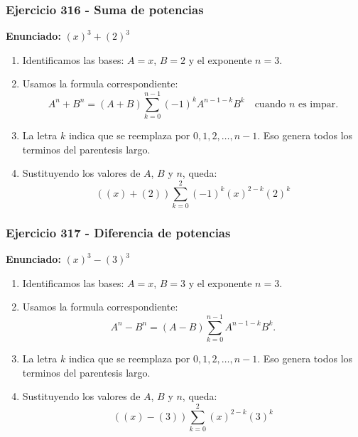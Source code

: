 \documentclass[11pt,a4paper]{article}
\begin{document}
\subsubsection*{Ejercicio 316 - Suma de potencias}
\textbf{Enunciado:} $ \left(x\right)^{3}+\left(2\right)^{3} $\par
\begin{enumerate}[leftmargin=2em]
\item Identificamos las bases: \(A=x\), \(B=2\) y el exponente \(n=3\).
\item Usamos la formula correspondiente: \[A^n+B^n=(A+B)\sum_{k=0}^{n-1}(-1)^kA^{n-1-k}B^k\quad\text{cuando }n\text{ es impar}.\]
\item La letra \(k\) indica que se reemplaza por \(0,1,2,\ldots,n-1\). Eso genera todos los terminos del parentesis largo.
\item Sustituyendo los valores de \(A\), \(B\) y \(n\), queda: \[\boxed{\left(\left(x\right)+\left(2\right)\right)\sum_{k=0}^{2}(-1)^k\left(x\right)^{2-k}\left(2\right)^k}\]
\end{enumerate}

\vspace{0.2cm}
\subsubsection*{Ejercicio 317 - Diferencia de potencias}
\textbf{Enunciado:} $ \left(x\right)^{3}-\left(3\right)^{3} $\par
\begin{enumerate}[leftmargin=2em]
\item Identificamos las bases: \(A=x\), \(B=3\) y el exponente \(n=3\).
\item Usamos la formula correspondiente: \[A^n-B^n=(A-B)\sum_{k=0}^{n-1}A^{n-1-k}B^k.\]
\item La letra \(k\) indica que se reemplaza por \(0,1,2,\ldots,n-1\). Eso genera todos los terminos del parentesis largo.
\item Sustituyendo los valores de \(A\), \(B\) y \(n\), queda: \[\boxed{\left(\left(x\right)-\left(3\right)\right)\sum_{k=0}^{2}\left(x\right)^{2-k}\left(3\right)^k}\]
\end{enumerate}

\vspace{0.2cm}
\end{document}
